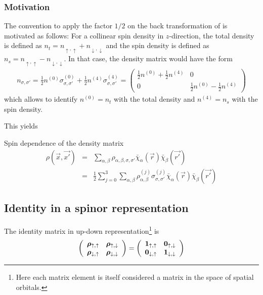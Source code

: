 \documentclass[11pt,a4paper]{report}
\begin{document}
\subsubsection{Motivation}
The convention to apply the factor $1/2$ on the back transformation of
 is motivated as follows:
For a collinear spin density in $z$-direction, the total density is
defined as $n_t=n_{\uparrow,\uparrow}+n_{\downarrow,\downarrow}$ and
the spin density is defined as
$n_s=n_{\uparrow,\uparrow}-n_{\downarrow,\downarrow}$. In that case,
the density matrix would have the form
\begin{eqnarray*}
n_{\sigma,\sigma'}=\frac{1}{2}n^{(0)}\sigma^{(0)}_{\sigma,\sigma'}
+\frac{1}{2}n^{(4)}\sigma^{(4)}_{\sigma,\sigma'}
=\left(\begin{array}{cc}\frac{1}{2}n^{(0)}+\frac{1}{2}n^{(4)}&0
\\0&\frac{1}{2}n^{(0)}-\frac{1}{2}n^{(4)}
\end{array}\right)
\end{eqnarray*}
which allows to identify $n^{(0)}=n_t$ with the total density and
$n^{(4)}=n_s$ with the spin density.




This yields
\begin{myshadowminipage}{Spin dependence of the density matrix}
\begin{eqnarray}
\rho(\vec{x},\vec{x'})
&=&\sum_{\alpha,\beta}\rho_{\alpha,\beta,\sigma,\sigma'}
\bar{\chi}_{\alpha}(\vec{r})\bar{\chi}_{\beta}(\vec{r'})
\\
&=&\frac{1}{2}\sum_{j=0}^3\sum_{\alpha,\beta}\rho_{\alpha,\beta}^{(j)}\sigma^{(j)}_{\sigma,\sigma'}
\bar{\chi}_{\alpha}(\vec{r})\bar{\chi}_{\beta}(\vec{r'})
\label{eq:denmatspindepcart}
\end{eqnarray}
\end{myshadowminipage}



\subsection{Identity in a spinor representation}
The identity matrix in up-down representation\footnote{Here each
  matrix element is itself considered a matrix in the space of spatial
  orbitals.} is
\begin{eqnarray}
\left(\begin{array}{cc}
\bm{\rho}_{\uparrow,\uparrow}&\bm{\rho}_{\uparrow,\downarrow}\\
\bm{\rho}_{\downarrow,\uparrow}&\bm{\rho}_{\downarrow,\downarrow}\\
\end{array}\right)
=
\left(\begin{array}{cc}
\bm{1}_{\uparrow,\uparrow}&\bm{0}_{\uparrow,\downarrow}\\
\bm{0}_{\downarrow,\uparrow}&\bm{1}_{\downarrow,\downarrow}\\
\end{array}\right)
\end{eqnarray}
\end{document}
